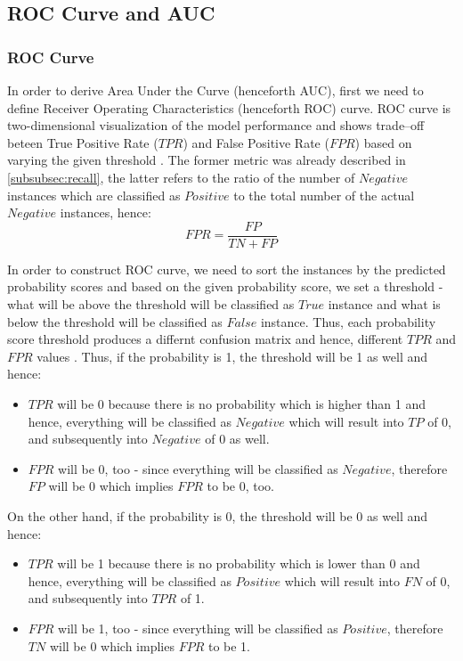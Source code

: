 \subsection{ROC Curve and AUC}
\subsubsection{ROC Curve}
In order to derive Area Under the Curve (henceforth AUC), first we need to define Receiver Operating Characteristics (henceforth ROC) curve.
ROC curve is two-dimensional visualization of the model performance and shows trade--off beteen True Positive Rate ($TPR$) and False Positive Rate ($FPR$) based on varying the given threshold \citep{han2011data}. The former metric was already described in \autoref{subsubsec:recall}, the latter refers to the ratio of the number of $Negative$ instances which are classified as $Positive$ to the total number of the actual $Negative$ instances, hence:
\begin{equation}\label{eq}
    FPR = \frac{FP}{TN + FP}
\end{equation}

In order to construct ROC curve, we need to sort the instances by the predicted probability scores and based on the given probability score, we set a threshold - what will be above the threshold will be classified as $True$ instance and what is below the threshold will be classified as $False$ instance. Thus, each probability score threshold produces a differnt confusion matrix and hence, different $TPR$ and $FPR$ values \citep{fawcett2006introduction}.
Thus, if the probability is 1, the threshold will be 1 as well and hence:
\begin{itemize}\setlength\itemsep{0em}
    \item $TPR$ will be 0 because there is no probability which is higher than 1 and hence, everything will be classified as $Negative$ which will result into $TP$ of 0, and subsequently into $Negative$ of 0 as well.
	\item $FPR$ will be 0, too - since everything will be classified as $Negative$, therefore $FP$ will be 0 which implies $FPR$ to be 0, too.
\end{itemize}
On the other hand, if the probability is 0, the threshold will be 0 as well and hence:
\begin{itemize}\setlength\itemsep{0em}
    \item $TPR$ will be 1 because there is no probability which is lower than 0 and hence, everything will be classified as $Positive$ which will result into $FN$ of 0, and subsequently into $TPR$ of 1.
	\item $FPR$ will be 1, too - since everything will be classified as $Positive$, therefore $TN$ will be 0 which implies $FPR$ to be 1.
\end{itemize}

